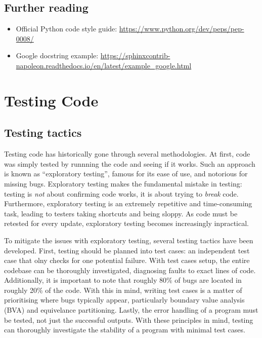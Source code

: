 \documentclass[11pt]{article}
\begin{document}
\inputminted[linenos=true]{python}{python_examples/docstring.py}

\subsection{Further reading}

\begin{itemize}
    \item Official Python code style guide: \url{https://www.python.org/dev/peps/pep-0008/}
    \item Google docstring example: \url{https://sphinxcontrib-napoleon.readthedocs.io/en/latest/example_google.html}
\end{itemize}

\newpage

\section{Testing Code}

\subsection{Testing tactics}

Testing code has historically gone through several methodologies. At first, code was simply tested by runnning the code and seeing if it works. Such an approach is known as ``exploratory testing'', famous for its ease of use, and notorious for missing bugs. Exploratory testing makes the fundamental mistake in testing: testing is \textit{not} about confirming code works, it is about trying to \textit{break} code. Furthermore, exploratory testing is an extremely repetitive and time-consuming task, leading to testers taking shortcuts and being sloppy. As code must be retested for every update, exploratory testing becomes increasingly inpractical.

To mitigate the issues with exploratory testing, several testing tactics have been developed. First, testing should be planned into test cases: an independent test case that olny checks for one potential failure. With test cases setup, the entire codebase can be thoroughly investigated, diagnosing faults to exact lines of code. Additionally, it is important to note that roughly 80\% of bugs are located in roughly 20\% of the code. With this in mind, writing test cases is a matter of prioritising where bugs typically appear, particularly boundary value analysis (BVA) and equivelance partitioning. Lastly, the error handling of a program must be tested, not just the successful outputs. With these principles in mind, testing can thoroughly investigate the stability of a program with minimal test cases.
\end{document}
